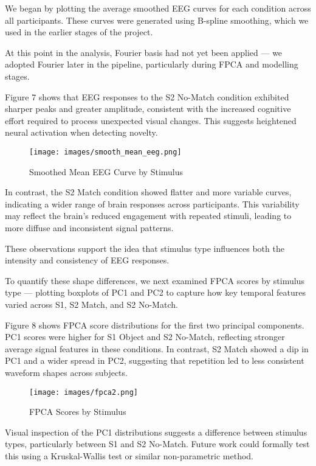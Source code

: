 \documentclass{article}
\begin{document}
We began by plotting the average smoothed EEG curves for each condition
across all participants. These curves were generated using B-spline
smoothing, which we used in the earlier stages of the project.

At this point in the analysis, Fourier basis had not yet been applied
--- we adopted Fourier later in the pipeline, particularly during FPCA
and modelling stages.

Figure 7 shows that EEG responses to the S2 No-Match condition exhibited
sharper peaks and greater amplitude, consistent with the increased
cognitive effort required to process unexpected visual changes. This
suggests heightened neural activation when detecting novelty.

\begin{figure}[H]
\centering
\texttt{[image: images/smooth\_mean\_eeg.png]}
\caption{Smoothed Mean EEG Curve by Stimulus}
\end{figure}

In contrast, the S2 Match condition showed flatter and more variable
curves, indicating a wider range of brain responses across participants.
This variability may reflect the brain's reduced engagement with
repeated stimuli, leading to more diffuse and inconsistent signal
patterns.

These observations support the idea that stimulus type influences both
the intensity and consistency of EEG responses.

To quantify these shape differences, we next examined FPCA scores by
stimulus type --- plotting boxplots of PC1 and PC2 to capture how key
temporal features varied across S1, S2 Match, and S2 No-Match.

Figure 8 shows FPCA score distributions for the first two principal
components. PC1 scores were higher for S1 Object and S2 No-Match,
reflecting stronger average signal features in these conditions. In
contrast, S2 Match showed a dip in PC1 and a wider spread in PC2,
suggesting that repetition led to less consistent waveform shapes across
subjects.

\begin{figure}[H]
\centering
\texttt{[image: images/fpca2.png]}
\caption{FPCA Scores by Stimulus}
\end{figure}

Visual inspection of the PC1 distributions suggests a difference between
stimulus types, particularly between S1 and S2 No-Match. Future work
could formally test this using a Kruskal-Wallis test or similar
non-parametric method.
\end{document}
